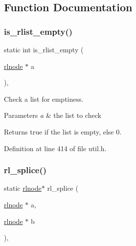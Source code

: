 \subsection{Function Documentation}
\mbox{\label{group__rlists_gaf60549214daf0df46bcd1a0d5ba5b661}} 
\subsubsection{\texorpdfstring{is\+\_\+rlist\+\_\+empty()}{is\_rlist\_empty()}}
{\footnotesize\ttfamily static int is\+\_\+rlist\+\_\+empty (\begin{DoxyParamCaption}\item[{\hyperlink{group__rlists_ga8f6244877f7ce2322c90525217ea6e7a}{rlnode} $\ast$}]{a }\end{DoxyParamCaption})\hspace{0.3cm}{\ttfamily [inline]}, {\ttfamily [static]}}



Check a list for emptiness. 


\begin{DoxyParams}{Parameters}
{\em a} & the list to check \\
\hline
\end{DoxyParams}
\begin{DoxyReturn}{Returns}
true if the list is empty, else 0. 
\end{DoxyReturn}


Definition at line 414 of file util.\+h.

\mbox{\label{group__rlists_gac04dfecc68239457f673c0a63c254541}} 
\subsubsection{\texorpdfstring{rl\+\_\+splice()}{rl\_splice()}}
{\footnotesize\ttfamily static \hyperlink{group__rlists_ga8f6244877f7ce2322c90525217ea6e7a}{rlnode}$\ast$ rl\+\_\+splice (\begin{DoxyParamCaption}\item[{\hyperlink{group__rlists_ga8f6244877f7ce2322c90525217ea6e7a}{rlnode} $\ast$}]{a,  }\item[{\hyperlink{group__rlists_ga8f6244877f7ce2322c90525217ea6e7a}{rlnode} $\ast$}]{b }\end{DoxyParamCaption})\hspace{0.3cm}{\ttfamily [inline]}, {\ttfamily [static]}}



